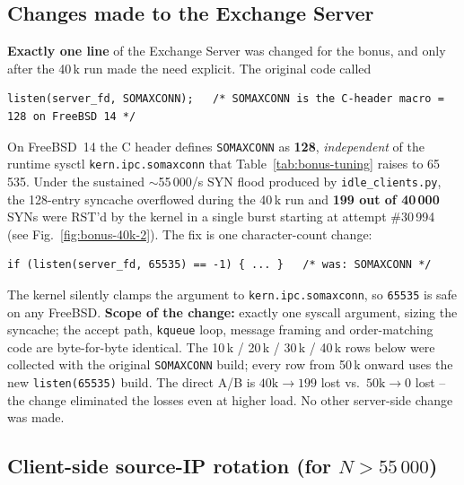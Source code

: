 \documentclass[11pt,a4paper]{article}
\begin{document}
\subsection{Changes made to the Exchange Server}
\label{sec:bonus-listen}

\textbf{Exactly one line} of the Exchange Server was changed for the bonus, and only
after the 40\,k run made the need explicit.  The original code called

\begin{lstlisting}
listen(server_fd, SOMAXCONN);   /* SOMAXCONN is the C-header macro = 128 on FreeBSD 14 */
\end{lstlisting}

On FreeBSD~14 the C header defines \texttt{SOMAXCONN} as \textbf{128},
\emph{independent} of the runtime sysctl \texttt{kern.ipc.somaxconn} that Table~\ref{tab:bonus-tuning}
raises to 65\,535.  Under the sustained $\sim$55\,000/s SYN flood produced by
\texttt{idle\_clients.py}, the 128-entry syncache overflowed during the 40\,k run and
\textbf{199 out of 40\,000} SYNs were RST'd by the kernel in a single burst starting at
attempt \#30\,994 (see Fig.~\ref{fig:bonus-40k-2}).  The fix is one character-count
change:

\begin{lstlisting}
if (listen(server_fd, 65535) == -1) { ... }   /* was: SOMAXCONN */
\end{lstlisting}

The kernel silently clamps the argument to \texttt{kern.ipc.somaxconn}, so
\texttt{65535} is safe on any FreeBSD.  \textbf{Scope of the change:} exactly one
syscall argument, sizing the syncache; the accept path, \texttt{kqueue} loop, message
framing and order-matching code are byte-for-byte identical.  The 10\,k / 20\,k / 30\,k
/ 40\,k rows below were collected with the original \texttt{SOMAXCONN} build; every row
from 50\,k onward uses the new \texttt{listen(65535)} build.  The direct A/B is
$40\text{k} \to 199$ lost vs.\ $50\text{k} \to 0$ lost -- the change eliminated the
losses even at higher load.  No other server-side change was made.

\subsection{Client-side source-IP rotation (for \texorpdfstring{$N > 55\,000$}{N > 55000})}
\label{sec:bonus-srcip}
\end{document}

